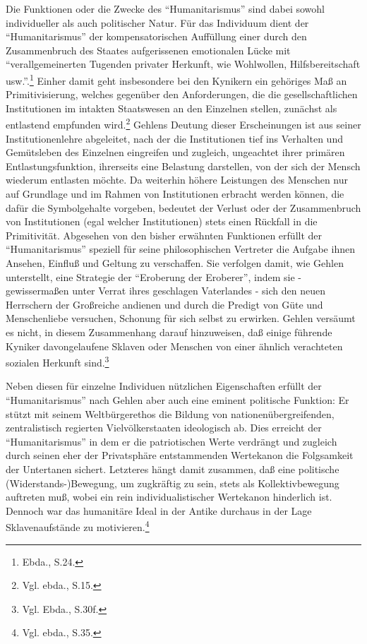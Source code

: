 \documentclass[12pt,a4paper]{article}
\begin{document}
Die Funktionen oder die Zwecke des "`Humanitarismus"' sind dabei sowohl
individueller als auch politischer Natur. Für das Individuum dient der
"`Humanitarismus"' der kompensatorischen Auffüllung einer durch den
Zusammenbruch des Staates aufgerissenen emotionalen Lücke mit
"`verallgemeinerten Tugenden privater Herkunft, wie Wohlwollen,
Hilfsbereitschaft usw."'.\footnote{Ebda., S.24.} Einher damit geht
insbesondere bei den Kynikern ein gehöriges Maß an Primitivisierung, welches
gegenüber den Anforderungen, die die gesellschaftlichen Institutionen im
intakten Staatswesen an den Einzelnen stellen, zunächst als entlastend
empfunden wird.\footnote{Vgl. ebda., S.15.} Gehlens Deutung dieser
Erscheinungen ist aus seiner Institutionenlehre abgeleitet, nach der die
Institutionen tief ins Verhalten und Gemütsleben des Einzelnen eingreifen und
zugleich, ungeachtet ihrer primären Entlastungsfunktion, ihrerseits eine
Belastung darstellen, von der sich der Mensch wiederum entlasten möchte. Da
weiterhin höhere Leistungen des Menschen nur auf Grundlage und im Rahmen von
Institutionen erbracht werden können, die dafür die Symbolgehalte vorgeben,
bedeutet der Verlust oder der Zusammenbruch von Institutionen (egal welcher
Institutionen) stets einen Rückfall in die Primitivität. Abgesehen von den
bisher erwähnten Funktionen erfüllt der "`Humanitarismus"' speziell für seine
philosophischen Vertreter die Aufgabe ihnen Ansehen, Einfluß und Geltung zu
verschaffen. Sie verfolgen damit, wie Gehlen unterstellt, eine Strategie der
"`Eroberung der Eroberer"', indem sie - gewissermaßen unter Verrat ihres
geschlagen Vaterlandes - sich den neuen Herrschern der Großreiche andienen
und durch die Predigt von Güte und Menschenliebe versuchen, Schonung für sich
selbst zu erwirken. Gehlen versäumt es nicht, in diesem Zusammenhang darauf
hinzuweisen, daß einige führende Kyniker davongelaufene Sklaven oder Menschen
von einer ähnlich verachteten sozialen Herkunft sind.\footnote{Vgl. Ebda.,
S.30f.}

Neben diesen für einzelne Individuen nützlichen Eigenschaften erfüllt der
"`Humanitarismus"' nach Gehlen aber auch eine eminent politische Funktion: Er
stützt mit seinem Weltbürgerethos die Bildung von nationenübergreifenden,
zentralistisch regierten Vielvölkerstaaten ideologisch ab. Dies erreicht der
"`Humanitarismus"' in dem er die patriotischen Werte verdrängt und zugleich
durch seinen eher der Privatsphäre entstammenden Wertekanon die Folgsamkeit
der Untertanen sichert. Letzteres hängt damit zusammen, daß eine politische
(Widerstands-)Bewegung, um zugkräftig zu sein, stets als Kollektivbewegung
auftreten muß, wobei ein rein individualistischer Wertekanon hinderlich ist.
Dennoch war das humanitäre Ideal in der Antike durchaus in der Lage
Sklavenaufstände zu motivieren.\footnote{Vgl. ebda., S.35.}
\end{document}
